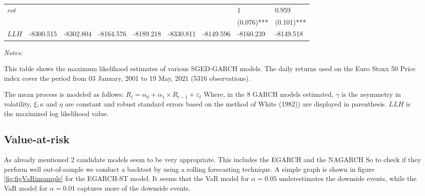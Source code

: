 \documentclass[a4paper, nobind]{templates/ociamthesis}
\begin{document}
\begin{landscape}
\begin{table}
\begin{threeparttable}
{\begin{tabular}[t]{lllllllll}
$rot$ &  &  &  &  &  &  & 1 & 0.959\\
 &  &  &  &  &  &  & (0.076)*** & (0.101)***\\
\addlinespace
$LLH$ & -8300.515 & -8302.804 & -8164.576 & -8189.218 & -8330.811 & -8149.596 & -8160.239 & -8149.518\\
\bottomrule
\end{tabular}}
\begin{tablenotes}
\item \textit{Notes:} 
\item This table shows the maximum likelihood estimates of various SGED-GARCH models. The daily returns used on the Euro Stoxx 50 Price index cover the period from 03 January, 2001 to 19 May, 2021 (5316 observations).
\item The mean process is modeled as follows: $R_t= \alpha_0+ \alpha_1 \times R_{t-1}+ \varepsilon_t$ Where, in the 8 GARCH models estimated, $\gamma$ is the asymmetry in volatility, $\xi, \kappa$ and $\eta$ are constant and robust standard errors based on the method of White (1982)) are displayed in parenthesis. $LLH$ is the maximized log likelihood value.
\end{tablenotes}
\end{threeparttable}
\end{table}
\end{landscape}

\clearpage
\newpage

\hypertarget{value-at-risk-1}{%
\subsection{Value-at-risk}\label{value-at-risk-1}}

\noindent As already mentioned 2 candidate models seem to be very appropriate. This includes the EGARCH and the NAGARCH So to check if they perform well out-of-sample we conduct a backtest by using a rolling forecasting technique. A simple graph is shown in figure \ref{fig:figVaRinsample} for the EGARCH-ST model. It seems that the VaR model for \(\alpha=0.05\) underestimates the downside events, while the VaR model for \(\alpha=0.01\) captures more of the downside events.
\end{document}
